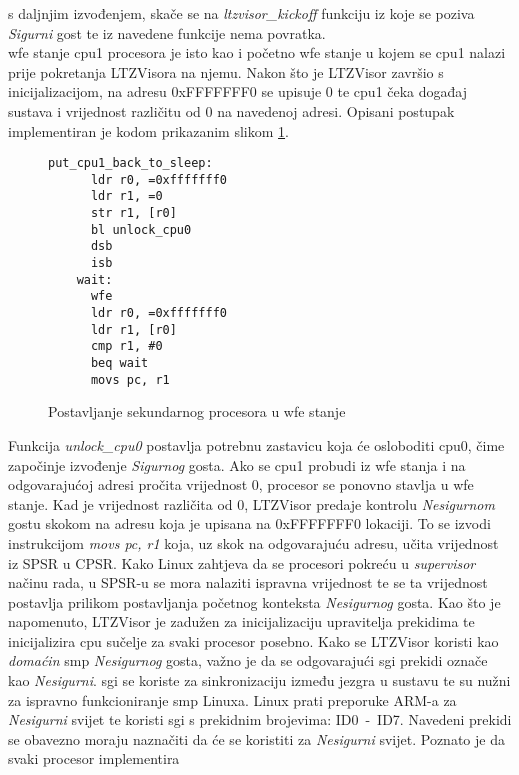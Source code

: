 \documentclass[times, utf8, diplomski, numeric]{fer}
\begin{document}
s daljnjim izvođenjem, skače se na \textit{ltzvisor\_kickoff} funkciju iz koje se poziva \textit{Sigurni} gost te iz navedene
funkcije nema povratka.\\
\gls{wfe} stanje \gls{cpu}1 procesora je isto kao i početno \gls{wfe} stanje u kojem se \gls{cpu}1 nalazi prije pokretanja LTZVisora na njemu.
Nakon što je LTZVisor završio s inicijalizacijom, na adresu 0xFFFFFFF0 se upisuje 0 te \gls{cpu}1 čeka događaj sustava i
vrijednost različitu od 0 na navedenoj adresi. Opisani postupak implementiran je kodom prikazanim slikom \ref{cpu1_wfe}.
\begin{figure}[H]
  \centering
  \lstset{numbers=left, numbersep=2pt, numberstyle=\tiny, breaklines=true, xleftmargin=.2\textwidth}
  \begin{lstlisting}[firstnumber=1]
    put_cpu1_back_to_sleep:
      ldr r0, =0xfffffff0
      ldr r1, =0
      str r1, [r0]
      bl unlock_cpu0
      dsb
      isb
    wait:
      wfe
      ldr r0, =0xfffffff0
      ldr r1, [r0]
      cmp r1, #0
      beq wait
      movs pc, r1
  \end{lstlisting}
  \caption{Postavljanje sekundarnog procesora u \gls{wfe} stanje}
  \label{cpu1_wfe}
\end{figure}
Funkcija \textit{unlock\_cpu0} postavlja potrebnu zastavicu koja će osloboditi \gls{cpu}0, čime započinje izvođenje \textit{Sigurnog}
gosta. Ako se \gls{cpu}1 probudi iz \gls{wfe} stanja i na odgovarajućoj adresi pročita vrijednost 0, procesor se ponovno stavlja u \gls{wfe}
stanje. Kad je vrijednost različita od 0, LTZVisor predaje kontrolu \textit{Nesigurnom} gostu skokom na adresu koja je upisana
na 0xFFFFFFF0 lokaciji. To se izvodi instrukcijom \textit{movs pc, r1} koja, uz skok na odgovarajuću adresu, učita
vrijednost iz SPSR u CPSR. Kako Linux zahtjeva da se procesori pokreću u \textit{supervisor} načinu rada, u SPSR-u se mora
nalaziti ispravna vrijednost te se ta vrijednost postavlja prilikom postavljanja početnog konteksta \textit{Nesigurnog} gosta.
Kao što je napomenuto, LTZVisor je zadužen za inicijalizaciju upravitelja prekidima te inicijalizira \gls{cpu} sučelje za svaki
procesor posebno. Kako se LTZVisor koristi kao \textit{domaćin} \gls{smp} \textit{Nesigurnog} gosta, važno je da se odgovarajući
\gls{sgi} prekidi označe kao \textit{Nesigurni}. \gls{sgi} se koriste za sinkronizaciju između jezgra u sustavu te su nužni za ispravno
funkcioniranje \gls{smp} Linuxa. Linux prati preporuke ARM-a za \textit{Nesigurni} svijet te koristi \gls{sgi} s prekidnim brojevima: ID0~-~ID7. Navedeni prekidi
se obavezno moraju naznačiti da će se koristiti za \textit{Nesigurni} svijet. Poznato je da svaki procesor implementira
\end{document}
